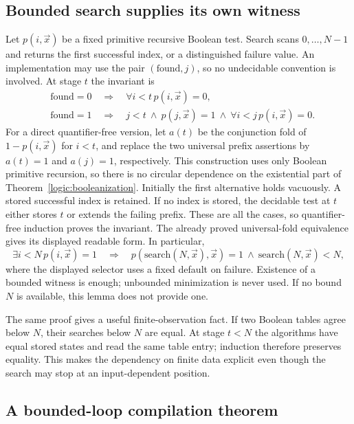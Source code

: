 \subsection{Bounded search supplies its own witness}

Let $p(i,\vec x)$ be a fixed primitive recursive Boolean test.  Search scans
$0,\ldots,N-1$ and returns the first successful index, or a distinguished
failure value.  An implementation may use the pair $(\mathrm{found},j)$,
so no undecidable convention is involved.  At stage $t$ the invariant is
\[
\begin{split}
 &\mathrm{found}=0\quad\Longrightarrow\quad
      \forall i<t\,p(i,\vec x)=0,\\
 &\mathrm{found}=1\quad\Longrightarrow\quad
      j<t\ \wedge\ p(j,\vec x)=1\ \wedge\
      \forall i<j\,p(i,\vec x)=0.
\end{split}
\]
For a direct quantifier-free version, let $a(t)$ be the conjunction fold of
$1-p(i,\vec x)$ for $i<t$, and replace the two universal prefix assertions by
$a(t)=1$ and $a(j)=1$, respectively.  This construction uses only Boolean
primitive recursion, so there is no circular dependence on the existential
part of Theorem~\ref{logic:booleanization}.  Initially the first alternative
holds vacuously.  A stored successful index is retained.  If no index is
stored, the decidable test at $t$ either stores $t$ or extends the failing
prefix.  These are all the cases, so quantifier-free induction proves the
invariant.  The already proved universal-fold equivalence gives its displayed
readable form.
In particular,
\[
 \exists i<N\,p(i,\vec x)=1
   \quad\Longrightarrow\quad
 p(\mathrm{search}(N,\vec x),\vec x)=1
 \ \wedge\ \mathrm{search}(N,\vec x)<N,
\]
where the displayed selector uses a fixed default on failure.
Existence of a bounded witness is enough; unbounded minimization is never
used.  If no bound $N$ is available, this lemma does not provide one.

The same proof gives a useful finite-observation fact.  If two Boolean tables
agree below $N$, their searches below $N$ are equal.  At stage $t<N$ the
algorithms have equal stored states and read the same table entry; induction
therefore preserves equality.  This makes the dependency on finite data
explicit even though the search may stop at an input-dependent position.

\subsection{A bounded-loop compilation theorem}

